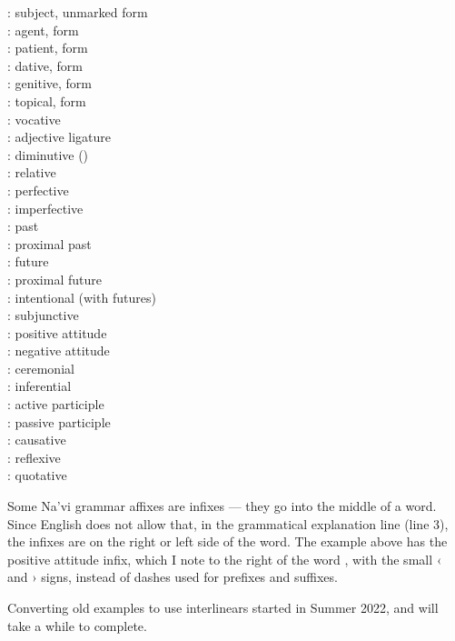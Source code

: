 \begin{multicols}{3}
\noindent{}: subject, unmarked form \\
: agent,  form \\
: patient,  form \\
: dative,  form \\
: genitive,  form \\
: topical,  form \\
: vocative  \\
: adjective  ligature\\
: diminutive () \\
: relative  \\
: perfective \\
: imperfective \\
: past \\
: proximal past \\
: future \\
: proximal future \\
: intentional (with futures) \\
: subjunctive \\
: positive attitude \\
: negative attitude \\
: ceremonial \\
: inferential \\
: active participle \\
: passive participle \\
: causative \\
: reflexive \\
: quotative 
\end{multicols}

\noindent Some Na'vi grammar affixes are infixes — they go into the
middle of a word.  Since English does not allow that, in the
grammatical explanation line (line 3), the infixes are on the right or
left side of the word.  The example above has the positive attitude
infix, which I note to the right of the word , with the small ‹
and › signs, instead of dashes used for prefixes and suffixes.

Converting old examples to use interlinears started in Summer 2022,
and will take a while to complete.


